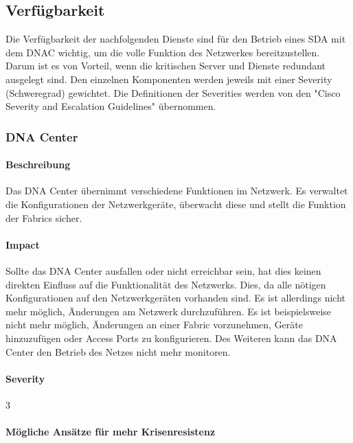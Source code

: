 \subsection{Verfügbarkeit}
Die Verfügbarkeit der nachfolgenden Dienste sind für den Betrieb eines SDA mit dem DNAC wichtig, um die volle Funktion des Netzwerkes bereitzustellen. Darum ist es von Vorteil, wenn die kritischen Server und Dienste redundant ausgelegt sind. Den einzelnen Komponenten werden jeweils mit einer Severity (Schweregrad) gewichtet. Die Definitionen der Severities werden von den "Cisco Severity and Escalation Guidelines" übernommen. \cite{cisco-severity-guidelines}

\subsubsection{DNA Center}

\paragraph{Beschreibung}

Das DNA Center übernimmt verschiedene Funktionen im Netzwerk. Es verwaltet die Konfigurationen der Netzwerkgeräte, überwacht diese und stellt die Funktion der Fabrics sicher. 

\paragraph{Impact}

Sollte das DNA Center ausfallen oder nicht erreichbar sein, hat dies keinen direkten Einfluss auf die Funktionalität des Netzwerks. Dies, da alle nötigen Konfigurationen auf den Netzwerkgeräten vorhanden sind. Es ist allerdings nicht mehr möglich, Änderungen am Netzwerk durchzuführen. Es ist beispielsweise nicht mehr möglich, Änderungen an einer Fabric vorzunehmen, Geräte hinzuzufügen oder Access Ports zu konfigurieren. Des Weiteren kann das DNA Center den Betrieb des Netzes nicht mehr monitoren.

\paragraph{Severity} 3

\paragraph{Mögliche Ansätze für mehr Krisenresistenz}

